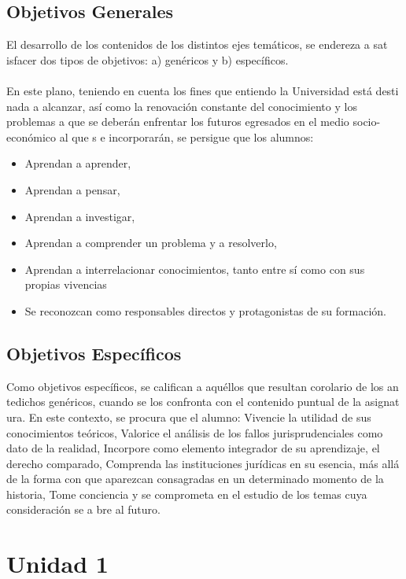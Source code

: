 \documentclass[12pt]{book}
\begin{document}
\section{Objetivos Generales}
El desarrollo de los contenidos de los distintos ejes temáticos, se endereza a sat
isfacer dos tipos de objetivos: a) genéricos y b) específicos. \\ \\
En este plano, teniendo en cuenta los fines que entiendo la Universidad está desti
nada a alcanzar, así como la renovación constante del conocimiento y los problemas a
que se deberán enfrentar los futuros egresados en el medio socio-económico al que s
e incorporarán, se persigue que los alumnos:\\
\begin{itemize}
\item Aprendan a aprender,
\item Aprendan a pensar,
\item Aprendan a investigar,
\item Aprendan a comprender un problema y a resolverlo,
\item Aprendan a interrelacionar conocimientos, tanto entre sí como con sus propias vivencias
\item Se reconozcan como responsables directos y protagonistas de su formación.
\end{itemize}

\section{Objetivos Específicos}
Como objetivos específicos, se califican a aquéllos que resultan corolario de los an
tedichos genéricos, cuando se los confronta con el contenido puntual de la asignat
ura. En este contexto, se procura que el alumno:
Vivencie la utilidad de sus conocimientos teóricos,
Valorice el análisis de los fallos jurisprudenciales como dato de la realidad,
Incorpore como elemento integrador de su aprendizaje, el derecho comparado,
Comprenda las instituciones jurídicas en su esencia, más allá de la forma con que aparezcan consagradas en un determinado momento de la historia,
Tome conciencia y se comprometa en el estudio de los temas cuya consideración se a
bre al futuro.


\chapter{Unidad 1}
\end{document}
